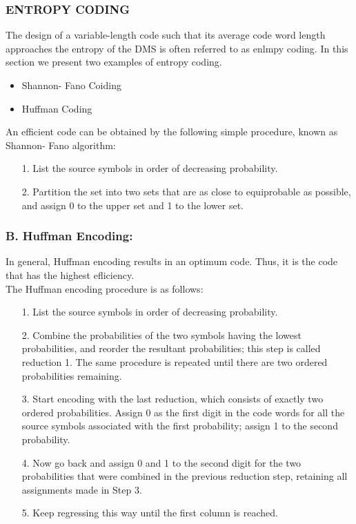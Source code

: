 \documentclass[a4]{beamer}
\begin{document}
\begin{frame}
\frametitle{ ENTROPY CODING}
The design of a variable-length code such that its average code word length approaches the
entropy of the DMS is often referred to as enlmpy coding. In this section we present two examples of
entropy coding.
\begin{itemize}
\item Shannon- Fano Coiding
\item Huffman Coding
\end{itemize}
\end{frame}
\begin{frame}
An efficient code can be obtained by the following simple procedure, known as
Shannon- Fano algorithm:
\begin{itemize}
\item[1.] List the source symbols in order of decreasing probability.
\item[2.] Partition the set into two sets that are as close to equiprobable as possible, and assign 0 to the
upper set and 1 to the lower set.
\end{itemize}
\end{frame}

\begin{frame}\frametitle{B. Huffman Encoding:}
In general, Huffman encoding results in an optimum code. Thus, it is the code that has the highest
efliciency.\\ The Huffman encoding procedure is as follows:
\begin{itemize}\item[1.] List the source symbols in order of decreasing probability.
\item[2.] Combine the probabilities of the two symbols having the lowest probabilities, and reorder
the resultant probabilities; this step is called reduction 1. The same procedure is repeated until
there are two ordered probabilities remaining.
\item[3.] Start encoding with the last reduction, which consists of exactly two ordered probabilities. Assign
0 as the first digit in the code words for all the source symbols associated with the first probability;
assign 1 to the second probability.
\item[4.] Now go back and assign 0 and 1 to the second digit for the two probabilities that were combined
in the previous reduction step, retaining all assignments made in Step 3.
\item[5.] Keep regressing this way until the first column is reached.
\end{itemize}
\end{frame}
\end{document}
